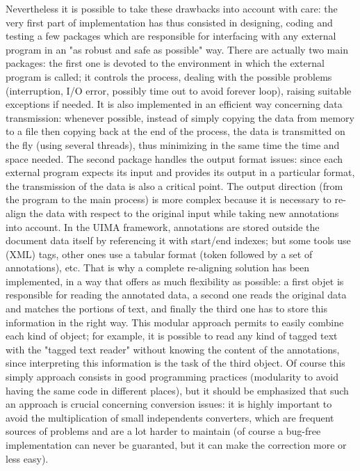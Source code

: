 Nevertheless it is possible to take these drawbacks into account with care: the very first part of implementation has thus consisted in designing, coding and testing a few packages which are responsible for interfacing with any external program in an "as robust and safe as possible" way. There are actually two main packages: the first one is devoted to the environment in which the external program is called; it controls the process, dealing with the possible problems (interruption, I/O error, possibly time out to avoid forever loop), raising suitable exceptions if needed. It is also implemented in an efficient way concerning data transmission: whenever possible, instead of simply copying the data from memory to a file then copying back at the end of the process, the data is transmitted on the fly (using several threads), thus minimizing in the same time the time and space needed. The second package handles the output format issues: since each external program expects its input and provides its output in a particular format, the transmission of the data is also a critical point. The output direction (from the program to the main process) is more complex because it is necessary to re-align the data with respect to the original input while taking new annotations into account. In the UIMA framework, annotations are stored outside the document data itself by referencing it with start/end indexes; but some tools use (XML) tags, other ones use a tabular format (token followed by a set of annotations), etc. That is why a complete re-aligning solution has been implemented, in a way that offers as much flexibility as possible: a first objet is responsible for reading the annotated data, a second one reads the original data and matches the portions of text, and finally the third one has to store this information in the right way. This modular approach permits to easily combine each kind of object; for example, it is possible to read any kind of tagged text with the "tagged text reader" without knowing the content of the annotations, since interpreting this information is the task of the third object. Of course this simply approach consists in good programming practices (modularity to avoid having the same code in different places), but it should be emphasized that such an approach is crucial concerning conversion issues: it is highly important to avoid the multiplication of small independents converters, which are frequent sources of problems and are a lot harder to maintain (of course a bug-free implementation can never be guaranted, but it can make the correction more or less easy).

